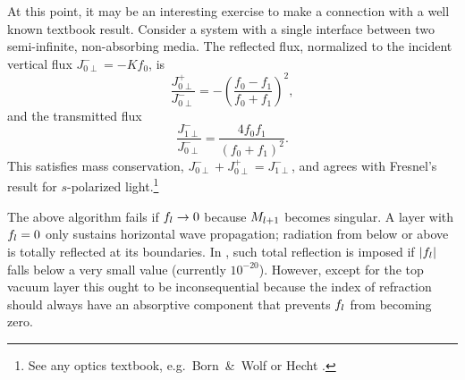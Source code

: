 At this point,
it may be an interesting exercise to make
 a connection with a well known textbook result.
Consider a system
with a single interface between two semi-infinite,
non-absorbing media.
The reflected flux,
normalized to the incident vertical flux $J_{0\perp}^-=-Kf_0$,
is
%
\begin{equation}
  \frac{J_{0\perp}^+}{J_{0\perp}^-}
  = - \left(\frac{f_0-f_1}{f_0+f_1}\right)^2,
\end{equation}
and the transmitted flux
%
\begin{equation}
  \frac{J_{1\perp}^-}{J_{0\perp}^-}
  = \frac{4f_0 f_1}{(f_0+f_1)^2}.
\end{equation}
This satisfies mass conservation, $J_{0\perp}^-+J_{0\perp}^+=J_{1\perp}^-$,
and agrees with Fresnel's result for $s$-polarized light.\footnote
{See any optics textbook, e.g.\ Born~\&~Wolf \cite[ch.~1.5.2]{BoWo99}
  or Hecht \cite[ch.~4.6.2]{Hec02}.}

The above algorithm fails if $f_{l}\to0$
because $M_{l+1}$ becomes singular.
A layer with $f_{l}=0$ only sustains horizontal wave propagation;
radiation from below or above is totally reflected at its boundaries.
In \BornAgain,
such total reflection is imposed if $|f_{l}|$ falls below a very small value
(currently $10^{-20}$).
However, except for the top vacuum layer
this ought to be inconsequential
because the index of refraction should always
have an absorptive component that prevents $f_{l}$ from becoming zero.



% 
%
